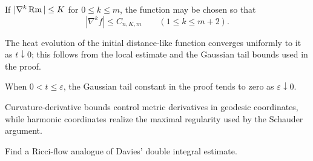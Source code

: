 \begin{remark}
\label{rem:chow-iii-distance-like-function-higher-derivatives}


If \(|\nabla^k\operatorname{Rm}|\le K\) for \(0\le k\le m\), the function may be chosen so
that
\[
 |\nabla^kf|\le C_{n,K,m}\qquad(1\le k\le m+2).
\]
\end{remark}

\begin{remark}
\label{rem:chow-iii-distance-like-heat-evolution-uniform-convergence}


The heat evolution of the initial distance-like function converges uniformly
to it as \(t\downarrow0\); this follows from the local estimate and the
Gaussian tail bounds used in the proof.
\end{remark}

\begin{remark}
\label{rem:chow-iii-distance-like-small-time-tail}


When \(0<t\le\varepsilon\), the Gaussian tail constant in the proof tends to
zero as \(\varepsilon\downarrow0\).
\end{remark}

\begin{remark}
\label{rem:chow-iii-geodesic-harmonic-coordinate-regularity}


Curvature-derivative bounds control metric derivatives in geodesic
coordinates, while harmonic coordinates realize the maximal regularity used
by the Schauder argument.
\end{remark}

\begin{claim}
\label{clm:chow-iii-ricci-flow-davies-estimate-problem}
Find a Ricci-flow analogue of Davies' double integral estimate.
\end{claim}
